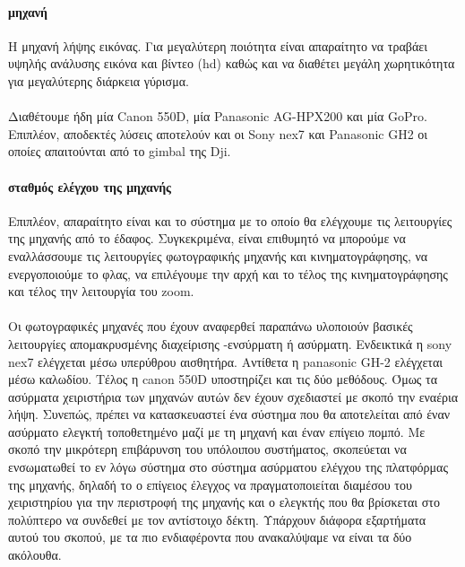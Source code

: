 \documentclass[a4paper, 12pt, twoside]{report}
\begin{document}
{{{{{{			\paragraph{μηχανή}{Η μηχανή λήψης εικόνας. Για μεγαλύτερη ποιότητα είναι απαραίτητο να τραβάει υψηλής ανάλυσης εικόνα και βίντεο (hd) καθώς και να διαθέτει μεγάλη χωρητικότητα για μεγαλύτερης διάρκεια γύρισμα.
			}
			\paragraph{}{Διαθέτουμε ήδη μία Canon 550D, μία Panasonic AG-HPX200 και μία GoPro. Επιπλέον, αποδεκτές λύσεις αποτελούν και οι Sony nex7 και Panasonic GH2 οι οποίες απαιτούνται από το gimbal της Dji.
			}
			
			\paragraph{σταθμός ελέγχου της μηχανής}{Επιπλέον, απαραίτητο είναι και το σύστημα με το οποίο θα ελέγχουμε τις λειτουργίες της μηχανής από το έδαφος. Συγκεκριμένα, είναι επιθυμητό να μπορούμε να εναλλάσσουμε τις λειτουργίες φωτογραφικής μηχανής και κινηματογράφησης, να ενεργοποιούμε το φλας, να επιλέγουμε την αρχή και το τέλος της κινηματογράφησης και τέλος την λειτουργία του zoom.
			}
			\paragraph{}{Οι φωτογραφικές μηχανές που έχουν αναφερθεί παραπάνω υλοποιούν βασικές λειτουργίες απομακρυσμένης διαχείρισης -ενσύρματη ή ασύρματη. Ενδεικτικά η sony nex7 ελέγχεται μέσω υπερύθρου αισθητήρα. Αντίθετα η panasonic GH-2 ελέγχεται μέσω καλωδίου. Τέλος η canon 550D υποστηρίζει και τις δύο μεθόδους. Όμως τα ασύρματα χειριστήρια των μηχανών αυτών δεν έχουν σχεδιαστεί με σκοπό την εναέρια λήψη. Συνεπώς, πρέπει να κατασκευαστεί ένα σύστημα που θα αποτελείται από έναν ασύρματο ελεγκτή τοποθετημένο μαζί με τη μηχανή και έναν επίγειο πομπό. Με σκοπό την μικρότερη επιβάρυνση του υπόλοιπου συστήματος, σκοπεύεται να ενσωματωθεί το εν λόγω σύστημα στο σύστημα ασύρματου ελέγχου της πλατφόρμας της μηχανής, δηλαδή το ο επίγειος έλεγχος να πραγματοποιείται διαμέσου του χειριστηρίου για την περιστροφή της μηχανής και ο ελεγκτής που θα βρίσκεται στο πολύπτερο να συνδεθεί με τον αντίστοιχο δέκτη. Υπάρχουν διάφορα εξαρτήματα αυτού του σκοπού, με τα πιο ενδιαφέροντα που ανακαλύψαμε να είναι τα δύο ακόλουθα.
			}
}}}}}}
\end{document}
